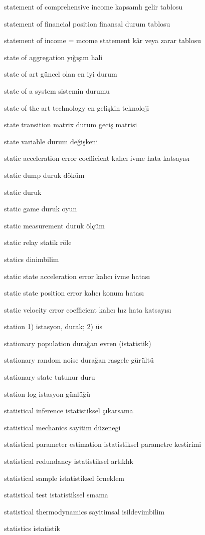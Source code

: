 \documentclass[12pt,fleqn]{article}\usepackage{../../common}
\begin{document}
statement of comprehensive income kapsamlı gelir tablosu

statement of financial position finansal durum tablosu

statement of income = ıncome statement kâr veya zarar tablosu

state of aggregation yığışım hali

state of art güncel olan en iyi durum

state of a system sistemin durumu

state of the art technology en gelişkin teknoloji

state transition matrix durum geciş matrisi

state variable durum değişkeni

static acceleration error coefficient kalıcı ivme hata katsayısı

static dump duruk döküm

static duruk

static game duruk oyun

static measurement duruk ölçüm

static relay statik röle

statics dinimbilim

static state acceleration error kalıcı ivme hatası

static state position error kalıcı konum hatası

static velocity error coefficient kalıcı hız hata katsayısı

station 1) istasyon, durak; 2) üs

stationary population durağan evren (istatistik)

stationary random noise durağan rasgele gürültü

stationary state tutunur duru

station log istasyon günlüğü

statistical inference istatistiksel çıkarsama

statistical mechanics sayitim düzenegi

statistical parameter estimation istatistiksel parametre kestirimi

statistical redundancy istatistiksel artıklık

statistical sample istatistiksel örneklem

statistical test istatistiksel sınama

statistical thermodynamics sayitimsal isildevimbilim

statistics istatistik
\end{document}
